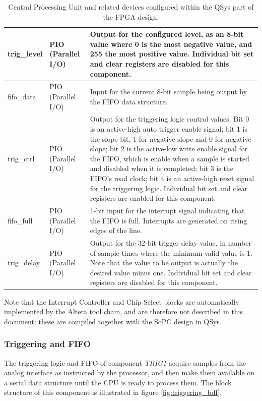 \documentclass[titlepage]{scrartcl}
\begin{document}
\begin{table}
\begin{center}
\begin{tabular}{|p{2cm} | p{4cm} | p{10cm} |}
		trig\_level & PIO (Parallel I/O) & Output for the configured level, as an 8-bit value where 0 is the most negative value, and 255 the most positive value. Individual bit set and clear registers are disabled for this component.\\ \hline
		fifo\_data & PIO (Parallel I/O) & Input for the current 8-bit sample being output by the FIFO data structure.\\ \hline
		trig\_ctrl & PIO (Parallel I/O) & Output for the triggering logic control values. Bit 0 is an active-high auto trigger enable signal; bit 1 is the slope bit, 1 for negative slope and 0 for negative slope; bit 2 is the active-low write enable signal for the FIFO, which is enable when a sample is started and disabled when it is completed; bit 3 is the FIFO's read clock; bit 4 is an active-high reset signal for the triggering logic. Individual bit set and clear registers are enabled for this component.\\ \hline
		fifo\_full & PIO (Parallel I/O) & 1-bit input for the interrupt signal indicating that the FIFO is full. Interrupts are generated on rising edges of the line.\\ \hline
		trig\_delay & PIO (Parallel I/O) & Output for the 32-bit trigger delay value, in number of sample times where the minimum valid value is 1. Note that the value to be output is actually the desired value minus one. Individual bit set and clear registers are disabled for this component.\\
		\hline
		\end{tabular}
		\end{center}
	     \label{tab:qsys}
              \caption{Central Processing Unit and related devices configured within the QSys part of the FPGA design.}
	\end{table}

	Note that the Interrupt Controller and Chip Select blocks are automatically implemented by the Altera tool chain, and are therefore not described in this document; these are compiled together with the SoPC design in QSys.\\
	
	\clearpage

	\subsubsection{Triggering and FIFO \label{sec:trigger}}
	The triggering logic and FIFO of component \textit{TRIG1} acquire samples from the analog interface as instructed by the processor, and then make them available on a serial data structure until the CPU is ready to process them. The block structure of this component is illustrated in figure \ref{fig:triggering_bdf}.\\
\end{document}
